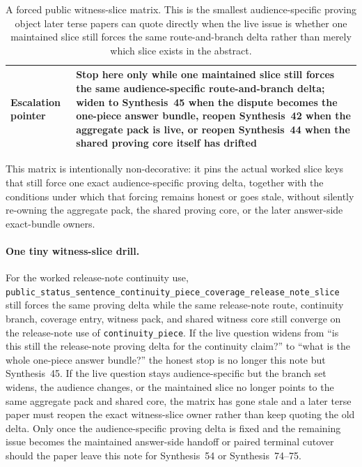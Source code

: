 \documentclass[11pt]{article}
\begin{document}
\begin{table}[t]
\begin{tabularx}{\linewidth}{@{}lX@{}}
Escalation pointer & Stop here only while one maintained slice still forces the same audience-specific route-and-branch delta; widen to Synthesis~45 when the dispute becomes the one-piece answer bundle, reopen Synthesis~42 when the aggregate pack is live, or reopen Synthesis~44 when the shared proving core itself has drifted \\
\bottomrule
\end{tabularx}
\caption{A forced public witness-slice matrix. This is the smallest audience-specific proving object later terse papers can quote directly when the live issue is whether one maintained slice still forces the same route-and-branch delta rather than merely which slice exists in the abstract.}
\label{tab:forced-public-witness-slice-matrix}
\end{table}

This matrix is intentionally non-decorative: it pins the actual worked slice keys that still force one exact audience-specific proving delta, together with the conditions under which that forcing remains honest or goes stale, without silently re-owning the aggregate pack, the shared proving core, or the later answer-side exact-bundle owners.\cite{series:workedexample}

\paragraph{One tiny witness-slice drill.}
For the worked release-note continuity use, \nolinkurl{public_status_sentence_continuity_piece_coverage_release_note_slice} still forces the same proving delta while the same release-note route, continuity branch, coverage entry, witness pack, and shared witness core still converge on the release-note use of \nolinkurl{continuity_piece}. If the live question widens from ``is this still the release-note proving delta for the continuity claim?'' to ``what is the whole one-piece answer bundle?'' the honest stop is no longer this note but Synthesis~45. If the live question stays audience-specific but the branch set widens, the audience changes, or the maintained slice no longer points to the same aggregate pack and shared core, the matrix has gone stale and a later terse paper must reopen the exact witness-slice owner rather than keep quoting the old delta. Only once the audience-specific proving delta is fixed and the remaining issue becomes the maintained answer-side handoff or paired terminal cutover should the paper leave this note for Synthesis~54 or Synthesis~74--75.\cite{series:workedexample}
\end{document}
